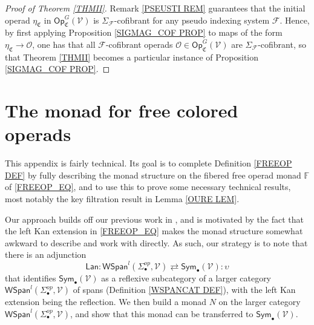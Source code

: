 \documentclass[a4paper,10pt
,draft
]{article}%
\numberwithin{equation}{section}
\numberwithin{figure}{section}
\theoremstyle{definition} %
\newcommand{\F}{\ensuremath{\mathcal F}}
\newcommand{\V}{\ensuremath{\mathcal V}}
\renewcommand{\O}{\ensuremath{\mathcal O}}
\newcommand{\1}{\ensuremath{\mathbbm 1}}%
\begin{document}
\begin{proof}[Proof of Theorem \ref{THMII}]
	Remark \ref{PSEUSTI REM}
	guarantees that the initial operad 
	$\eta_{\mathfrak{C}}$
	in $\mathsf{Op}^G_{\mathfrak{C}}(\V)$
	is $\Sigma_{\F}$-cofibrant for any
	pseudo indexing system $\F$.
	Hence, by first applying Proposition \ref{SIGMAG_COF PROP}
	to maps of the form $\eta_{\mathfrak{C}} \to \O$,
	one has that all $\F$-cofibrant operads
	$\O \in \mathsf{Op}^G_{\mathfrak{C}}(\V)$
	are $\Sigma_{\F}$-cofibrant,
	so that Theorem \ref{THMII} becomes a particular instance of 
	Proposition \ref{SIGMAG_COF PROP}.
\end{proof}








\appendix


\section{The monad for free colored operads}
\label{MONAD_APDX}

This appendix is fairly technical.
Its goal is to complete Definition \ref{FREEOP DEF}
by fully describing the monad structure 
on the fibered free operad monad $\mathbb{F}$
of \eqref{FREEOP_EQ},
and to use this to prove some necessary technical results,
most notably the key filtration result in Lemma \ref{OURE LEM}.


Our approach builds off our previous work in \cite{BP_geo},
and is motivated by the fact that the left Kan extension in \eqref{FREEOP_EQ} makes the monad structure somewhat awkward to describe and work with directly.
As such, our strategy is to note that there is an adjunction 
\begin{equation}\label{SPANSYMADJ EQ}
\mathsf{Lan} \colon
\mathsf{WSpan}^l(\Sigma_{\bullet}^{op},\mathcal{V}) 
\rightleftarrows
\mathsf{Sym}_{\bullet}(\mathcal{V})
\colon \upsilon
\end{equation}
that identifies $\mathsf{Sym}_{\bullet}(\V)$ 
as a reflexive subcategory of a larger category 
$\mathsf{WSpan}^l(\Sigma_{\bullet}^{op},\mathcal{V})$
of spans (Definition \ref{WSPANCAT DEF}),
with the left Kan extension being the reflection.
We then build a monad $N$ on the larger category 
$\mathsf{WSpan}^l(\Sigma_{\bullet}^{op},\mathcal{V})$,
and show that this monad can be transferred to 
$\mathsf{Sym}_{\bullet}(\mathcal{V})$.
\end{document}
